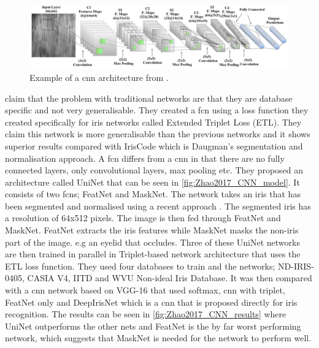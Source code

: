 \begin{figure}[H]
\centering
\includegraphics[width=\textwidth]{figures/Al_Waisy2017_CNN_model.png} 
\caption{Example of a \gls{cnn} architecture  from \cite{Al-Waisy2017}.}
\label{fig:Al_Waisy2017_CNN_model}
\end{figure}


\cite{Zhao2017a} claim that the problem with traditional networks are that they are database specific and not very generalisable. They created a \gls{fcn} using a loss function they created specifically for iris networks called Extended Triplet Loss (ETL). They claim this network is more generalisable than the previous networks and it shows superior results compared with IrisCode which is Daugman's segmentation and normalisation approach. A \gls{fcn} differs from a \gls{cnn} in that there are no fully connected layers, only convolutional layers, max pooling etc. They proposed an architecture called UniNet that can be seen in \autoref{fig:Zhao2017_CNN_model}. It consists of two \gls{fcn}s; FeatNet and MaskNet. The network takes an iris that has been segmented and normalised using a recent approach \citep{Zhao2015a}. The segmented iris has a resolution of 64x512 pixels. The image is then fed through FeatNet and MaskNet. FeatNet extracts the iris features while MaskNet masks the non-iris part of the image. e.g an eyelid that occludes.  Three of these UniNet networks are then trained in parallel in Triplet-based network architecture that uses the ETL loss function. They used four databases to train and the networks; ND-IRIS-0405, CASIA V4, IITD and WVU Non-ideal Iris Database. It was then compared with a \gls{cnn} network based on VGG-16 that used softmax, \gls{cnn} with triplet, FeatNet only and DeepIrisNet which is a \gls{cnn} that is proposed directly for iris recognition. The results can be seen in \autoref{fig:Zhao2017_CNN_results} where UniNet outperforms the other nets and FeatNet is the by far worst performing network, which suggests that MaskNet is needed for the network to perform well. 

